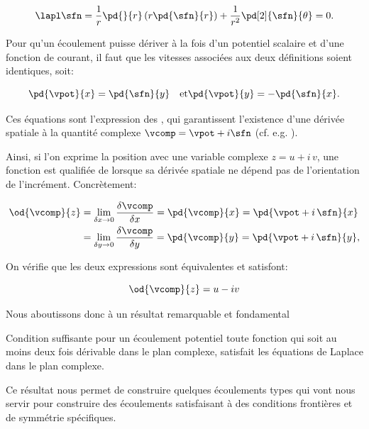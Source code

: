 \begin{equation}
\lapl \sfn = \frac{1}{r}\pd{}{r}\left(r\pd{\sfn}{r}\right) + \frac{1}{r^2}\pd[2]{\sfn}{\theta} = 0. 
  \label{eq:laplace_cp}
\end{equation}

Pour qu'un écoulement puisse dériver à la fois d'un potentiel scalaire et d'une fonction de courant, il faut
que les vitesses associées aux deux définitions soient identiques, soit: 

\begin{equation}
  \pd{\vpot}{x} = \pd{\sfn}{y}\quad\text{et}
  \pd{\vpot}{y} = -\pd{\sfn}{x}. 
  \label{eq:cauchy-riemann}
\end{equation}

Ces équations sont l'expression des , qui garantissent l'existence d'une dérivée spatiale à la quantité complexe $\vcomp =\vpot + i \sfn$ (cf. e.g. \cite[sect. 6.2, p. 399]{arfken01aa}). 

Ainsi, si l'on exprime la position avec une variable complexe $z = u + i\,v$, une fonction est qualifiée de  lorsque sa dérivée spatiale ne dépend pas de l'orientation de l'incrément.  Concrètement: 

\begin{displaymath}
  \begin{split}
    \od{\vcomp}{z} &= \lim_{\delta x \rightarrow 0}\frac{\delta \vcomp}{\delta x} = \pd{\vcomp}{x} = \pd{\vpot + i\,\sfn}{x} \\
                   &= \lim_{\delta y \rightarrow 0}\frac{\delta \vcomp}{\delta y} = \pd{\vcomp}{y} = \pd{\vpot + i\,\sfn}{y}, 
  \end{split}
\end{displaymath}

On vérifie que les deux expressions sont équivalentes et satisfont: 

\begin{displaymath}
    \od{\vcomp}{z} = u - iv
\end{displaymath}

Nous aboutissons donc à un résultat remarquable et fondamental
\begin{key}{Condition suffisante pour un écoulement potentiel}
toute fonction  qui soit au moins deux fois dérivable dans le plan complexe, satisfait les équations de Laplace dans le plan complexe. 
\end{key}

Ce résultat nous permet de construire quelques écoulements types qui vont nous servir pour construire des écoulements satisfaisant à des conditions frontières et de symmétrie spécifiques. 


